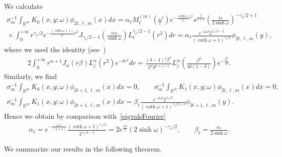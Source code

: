 \documentclass[pdftex]{sigma}
\numberwithin{equation}{section}
\numberwithin{theorem}{section}
\numberwithin{proposition}{section}
\numberwithin{lemma}{section}
\numberwithin{corollary}{section}
\numberwithin{definition}{section}
\numberwithin{example}{section}
\numberwithin{remark}{section}
\numberwithin{note}{section}
\theoremstyle{remark}
\newcommand{\mR}{\mathbb{R}}
\newcommand{\uy}{\underline{y}}
\def\a{{\alpha}}
\def\d{{\delta}}
\def\o{{\omega}}
\begin{document}
We calculate
\begin{gather*}
\sigma_{m}^{-1}\int_{\mR^{m}} K_{0}(x,y;\omega) \phi_{2t,\ell,m} (x)dx = \alpha_{\ell}
M_{\ell}^{(m)}(\uy') e^{-\frac{\coth{\o}}{2}s^{2}}s^{\frac{\ell}{1+c}}\left( \frac{i s}{2
\sinh{\o}}\right)^{-\gamma_{\ell}/2+1}\\
{}
\times \int_{0}^{+\infty} r^{\gamma_{\ell}/2} e^{-\frac{(\coth{\o}+1)}{2}r^{2}}
J_{\gamma_{\ell}/2 -1} \left( \frac{i r s}{\sinh{\o}}\right)L_{t}^{\gamma_{\ell}/2-1}(r^{2}) dr
=\alpha_{\ell} \frac{e^{-2\o t} 2^{\gamma_{\ell}/2-1}}{(\coth{\o}+1)^{\gamma_{\ell}/2}}
\phi_{2t,\ell,m}(y),
\end{gather*}
where we used the identity (see~\cite[Corollary 4.6]{Orsted2})
\begin{gather*}
2\int_{0}^{+\infty}r^{\alpha+1}J_{\a}(r\beta)L_{j}^{\a}(r^{2})e^{-\d r^{2}}dr=
\frac{(\d-1)^{j}\beta^{\alpha}}{2^{\alpha}\d^{\alpha+j+1}}L_{j}^{\a}\left(\frac{\beta^{2}}{4
\d(1-\d)}\right)e^{-\frac{\beta^{2}}{4\d}}.
\end{gather*}
Similarly, we f\/ind
\begin{gather*}
\sigma_{m}^{-1} \int_{\mR^{m}} K_{0}(x,y;\omega) \phi_{2t+1,\ell,m}(x) dx = 0,\qquad
\sigma_{m}^{-1} \int_{\mR^{m}} K_{1}(x,y;\omega) \phi_{2t,\ell,m} (x)dx = 0,\\
\sigma_{m}^{-1} \int_{\mR^{m}} K_{1}(x,y;\omega) \phi_{2t+1,\ell,m} (x) dx = \beta_{\ell}
\frac{e^{-2\o t} 2^{\gamma_{\ell}/2}}{(\coth{\o}+1)^{\gamma_{\ell}/2+1}} \phi_{2t+1,\ell,m}(y).
\end{gather*}
Hence we obtain by comparison with~\eqref{eigvalsFourier}
\begin{gather*}
\alpha_{\ell} = e^{-\frac{\o \ell}{(1+c)}}
\frac{(\coth{\o}+1)^{\gamma_{\ell}/2}}{2^{\gamma_{\ell}/2-1}} = 2 e^{\frac{\o \d}{2}} (2
\sinh{\o})^{-\gamma_{\ell}/2},\qquad
\beta_{\ell} = \frac{ \alpha_{\ell}}{2\sinh{\o}}.
\end{gather*}

We summarize our results in the following theorem.
\end{document}
